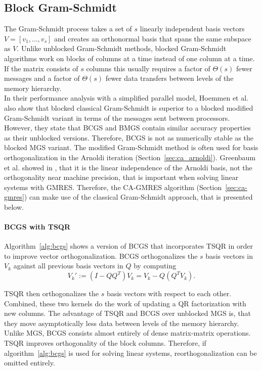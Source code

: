 \documentclass{scrartcl}
\numberwithin{equation}{section}
\begin{document}
\subsection{Block Gram-Schmidt} \label{sec:gs}
The Gram-Schmidt process takes a set of $s$ linearly independent basis vectors $V = [v_1, \ldots, v_s]$ and creates an orthonormal basis that spans the same subspace as $V$. Unlike unblocked Gram-Schmidt methods, blocked Gram-Schmidt algorithms work on blocks of columns at a time instead of one column at a time. If the matrix consists of $s$ columns this usually requires a factor of $\Theta (s)$ fewer messages and a factor of $\Theta(s)$ fewer data transfers between levels of the memory hierarchy.\\
In their performance analysis with a simplified parallel model, Hoemmen et al. \cite{Hoemmen:2010:CKS:1970638} also show that blocked classical Gram-Schmidt is superior to a blocked modified Gram-Schmidt variant in terms of the messages sent between processors. However, they state that BCGS and BMGS contain similar accuracy properties as their unblocked versions. Therefore, BCGS is not as numerically stable as the blocked MGS variant. The modified Gram-Schmidt method is often used for basis orthogonalization in the Arnoldi iteration (Section~\ref{sec:ca_arnoldi}). Greenbaum et al. showed in \cite{Greenbaum97numericalbehaviour}, that it is the linear independence of the Arnoldi basis, not the orthogonality near machine precision, that is important when solving linear systems with GMRES. Therefore, the CA-GMRES algorithm (Section~\ref{sec:ca-gmres}) can make use of the classical Gram-Schmidt approach, that is presented below.

\paragraph{BCGS with TSQR} Algorithm~\ref{alg:bcgs} shows a version of BCGS that incorporates TSQR in order to improve vector orthogonalization. BCGS orthogonalizes the $s$ basis vectors in $V_k$ against all previous basis vectors in $Q$ by computing
\begin{equation}
	V_k' := (I - QQ^T)V_k = V_k - Q(Q^T V_k).
\end{equation}

TSQR then orthogonalizes the $s$ basis vectors with respect to each other. Combined, these two kernels do the work of updating a QR factorization with new columns. The advantage of TSQR and BCGS over unblocked MGS is, that they move asymptotically less data between levels of the memory hierarchy. Unlike MGS, BCGS consists almost entirely of dense matrix-matrix operations. TSQR improves orthogonality of the block columns. Therefore, if algorithm~\ref{alg:bcgs} is used for solving linear systems, reorthogonalization can be omitted entirely.
\end{document}
